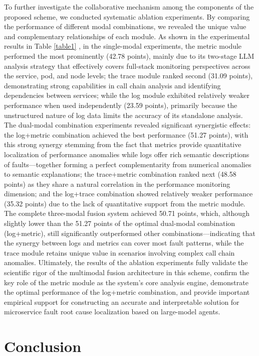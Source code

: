 \documentclass[10pt]{article}
\let\oldref\ref
\renewcommand{\ref}[1]{%
    \textcolor{blue}{\oldref{#1}}%
}
\begin{document}
To further investigate the collaborative mechanism among the components of the proposed scheme, we conducted systematic ablation experiments. By comparing the performance of different modal combinations, we revealed the unique value and complementary relationships of each module. As shown in the experimental results in Table \ref{table1}, in the single-modal experiments, the metric module performed the most prominently (42.78 points), mainly due to its two-stage LLM analysis strategy that effectively covers full-stack monitoring perspectives across the service, pod, and node levels; the trace module ranked second (31.09 points), demonstrating strong capabilities in call chain analysis and identifying dependencies between services; while the log module exhibited relatively weaker performance when used independently (23.59 points), primarily because the unstructured nature of log data limits the accuracy of its standalone analysis. The dual-modal combination experiments revealed significant synergistic effects: the log+metric combination achieved the best performance (51.27 points), with this strong synergy stemming from the fact that metrics provide quantitative localization of performance anomalies while logs offer rich semantic descriptions of faults—together forming a perfect complementarity from numerical anomalies to semantic explanations; the trace+metric combination ranked next (48.58 points) as they share a natural correlation in the performance monitoring dimension; and the log+trace combination showed relatively weaker performance (35.32 points) due to the lack of quantitative support from the metric module. The complete three-modal fusion system achieved 50.71 points, which, although slightly lower than the 51.27 points of the optimal dual-modal combination (log+metric), still significantly outperformed other combinations—indicating that the synergy between logs and metrics can cover most fault patterns, while the trace module retains unique value in scenarios involving complex call chain anomalies. Ultimately, the results of the ablation experiments fully validate the scientific rigor of the multimodal fusion architecture in this scheme, confirm the key role of the metric module as the system’s core analysis engine, demonstrate the optimal performance of the log+metric combination, and provide important empirical support for constructing an accurate and interpretable solution for microservice fault root cause localization based on large-model agents.

\section{Conclusion}
\end{document}

